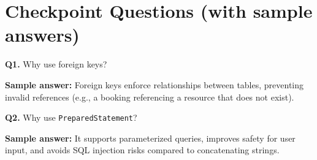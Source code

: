 \documentclass[11pt]{article}
\begin{document}
\section{Checkpoint Questions (with sample answers)}
\textbf{Q1.} Why use foreign keys?\par
\textbf{Sample answer:} Foreign keys enforce relationships between tables, preventing invalid references (e.g., a booking referencing a resource that does not exist).

\vspace{0.6em}
\textbf{Q2.} Why use \texttt{PreparedStatement}?\par
\textbf{Sample answer:} It supports parameterized queries, improves safety for user input, and avoids SQL injection risks compared to concatenating strings.
\end{document}
